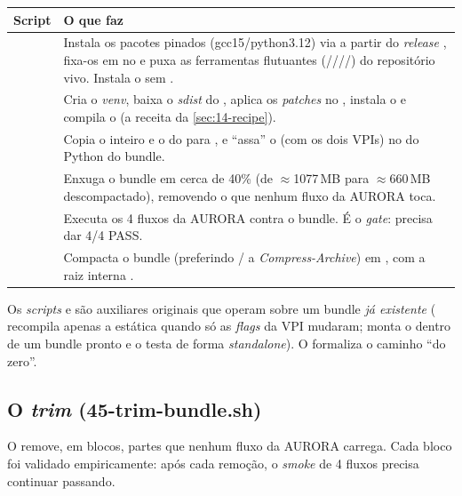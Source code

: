 \begin{tabularx}{\linewidth}{Y Z}
\toprule
\textbf{Script} & \textbf{O que faz} \\
\midrule
{} & Instala os pacotes pinados (gcc15/python3.12) via  a partir do \emph{release} , fixa-os em  no  e puxa as ferramentas flutuantes (////) do repositório vivo. Instala o  sem . \\
 & Cria o \emph{venv}, baixa o \emph{sdist} do , aplica os \emph{patches} no , instala o  e compila o  (a receita da \autoref{sec:14-recipe}). \\
 & Copia o  inteiro e o  do  para , e \enquote{assa} o  (com os dois VPIs) no  do Python do bundle. \\
 & Enxuga o bundle em cerca de 40\% (de $\approx$1077\,MB para $\approx$660\,MB descompactado), removendo o que nenhum fluxo da AURORA toca. \\
 & Executa os 4 fluxos da AURORA contra o bundle. É o \emph{gate}: precisa dar 4/4 PASS. \\
 & Compacta o bundle (preferindo / a \emph{Compress-Archive}) em , com a raiz interna . \\
\bottomrule
\end{tabularx}

\medskip

Os \emph{scripts}  e  são
auxiliares originais que operam sobre um bundle \emph{já existente}
( recompila apenas a  estática quando só as \emph{flags} da VPI
mudaram;  monta o  dentro de um bundle pronto e o testa de
forma \emph{standalone}). O  formaliza o caminho
\enquote{do zero}.

\subsection{O \emph{trim} (45-trim-bundle.sh)}

O  remove, em blocos, partes que nenhum fluxo da
AURORA carrega. Cada bloco foi validado empiricamente: após cada remoção, o
\emph{smoke} de 4 fluxos precisa continuar passando.

